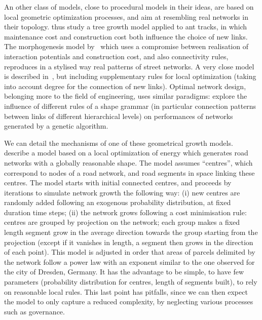 \documentclass[10pt]{article}
\begin{document}
An other class of models, close to procedural models in their ideas, are based on local geometric optimization processes, and aim at resembling real networks in their topology. \cite{bottinelli2017balancing} thus study a tree growth model applied to ant tracks, in which maintenance cost and construction cost both influence the choice of new links. The morphogenesis model by~\cite{courtat2011mathematics} which uses a compromise between realisation of interaction potentials and construction cost, and also connectivity rules, reproduces in a stylised way real patterns of street networks. A very close model is described in~\cite{rui2013exploring}, but including supplementary rules for local optimization (taking into account degree for the connection of new links). Optimal network design, belonging more to the field of engineering, uses similar paradigms: \cite{vitins2010patterns} explore the influence of different rules of a shape grammar (in particular connection patterns between links of different hierarchical levels) on performances of networks generated by a genetic algorithm.


We can detail the mechanisms of one of these geometrical growth models. \cite{barthelemy2008modeling} describe a model based on a local optimization of energy which generates road networks with a globally reasonable shape. The model assumes ``centres'', which correspond to nodes of a road network, and road segments in space linking these centres. The model starts with initial connected centres, and proceeds by iterations to simulate network growth the following way: (i) new centres are randomly added following an exogenous probability distribution, at fixed duration time steps; (ii) the network grows following a cost minimisation rule: centres are grouped by projection on the network; each group makes a fixed length segment grow in the average direction towards the group starting from the projection (except if it vanishes in length, a segment then grows in the direction of each point). This model is adjusted in order that areas of parcels delimited by the network follow a power law with an exponent similar to the one observed for the city of Dresden, Germany. It has the advantage to be simple, to have few parameters (probability distribution for centres, length of segments built), to rely on reasonable local rules. This last point has pitfalls, since we can then expect the model to only capture a reduced complexity, by neglecting various processes such as governance.
\end{document}
